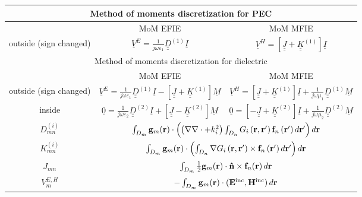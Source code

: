 \begin{table}[h!]
\centering
\begin{tabular}{|c||c|c|}
  \hline
  \multicolumn{3}{|c|}{Method of moments discretization for PEC} \\
  \hline
  \hline
   & MoM EFIE & MoM MFIE \\
  \hline
  outside (sign changed) & $\underline{V}^E =  \frac{1}{j \omega \varepsilon_1}  \underline{\underline{D}}^{(1)} \underline{I}$ & $\underline{V}^H =  \left[\underline{\underline{J}} + \underline{\underline{K}}^{(1)} \right] \underline{I}$ \\
  \hline
  \hline
  \multicolumn{3}{|c|}{Method of moments discretization for dielectric} \\
  \hline
  \hline
   & MoM EFIE & MoM MFIE \\
  \hline
  outside (sign changed) & $\underline{V}^E =  \frac{1}{j \omega \varepsilon_1}  \underline{\underline{D}}^{(1)} \underline{I} -\left[\underline{\underline{J}} + \underline{\underline{K}}^{(1)} \right] \underline{M} $ & $\underline{V}^H =  \left[\underline{\underline{J}} + \underline{\underline{K}}^{(1)} \right] \underline{I} + \frac{1}{j \omega \mu_1}  \underline{\underline{D}}^{(1)} \underline{M}$ \\
  \hline
  inside  & $\underline{0} =  \frac{1}{j \omega \varepsilon_2}  \underline{\underline{D}}^{(2)} \underline{I} + \left[\underline{\underline{J}} - \underline{\underline{K}}^{(2)} \right] \underline{M} $ & $\underline{0} =  \left[-\underline{\underline{J}} + \underline{\underline{K}}^{(2)} \right] \underline{I} + \frac{1}{j \omega \mu_2}  \underline{\underline{D}}^{(2)} \underline{M}$ \\
  \hline
  \hline
$D_{mn}^{(i)}$ & \multicolumn{2}{|c|}{$\int_{D_m}\mathbf{g}_m \!\left(\mathbf{r}\right) \cdot \left( \left(\nabla \nabla \cdot + k_i^2\right) \int_{D_n} G_i\left(\mathbf{r}, \mathbf{r}'\right) \mathbf{f}_n\left(\mathbf{r}'\right) d\mathbf{r}' \right) d\mathbf{r}$} \\
\hline
 $K_{mn}^{(i)}$ & \multicolumn{2}{|c|}{$\int_{D_m} \mathbf{g}_m \!\left(\mathbf{r}\right) \cdot \left(\int_{D_n} \nabla G_i\left(\mathbf{r}, \mathbf{r}'\right) \times \mathbf{f}_n\left(\mathbf{r}'\right) d\mathbf{r}'\right) d\mathbf{r}$} \\
  \hline
$J_{mn}$ & \multicolumn{2}{|c|}{$\int_{D_m} \frac{1}{2} \mathbf{g}_m \!\left(\mathbf{r}\right) \cdot \mathbf{\hat{n}} \times \mathbf{f}_{n}\!\left(\mathbf{r}\right)d\mathbf{r}$} \\
  \hline
$V_m^{E,H}$ & \multicolumn{2}{|c|}{$-\int_{D_m}\mathbf{g}_m \!\left(\mathbf{r}\right) \cdot \left(\mathbf{E}^\text{inc},\mathbf{H}^\text{inc}\right) d\mathbf{r}$} \\
\hline
\end{tabular}
\end{table}



